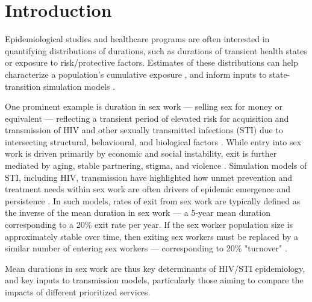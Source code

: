 \section{Introduction}\label{intro}
Epidemiological studies and healthcare programs
are often interested in quantifying distributions of durations,
such as durations of transient health states or exposure to risk/protective factors.
Estimates of these distributions can help
characterize a population's cumulative exposure \cite{Ben-Shlomo2023}, and
inform inputs to state-transition simulation models \cite{Garnett2011}.
\par
One prominent example is duration in sex work
--- selling sex for money or equivalent ---
reflecting a transient period of elevated risk for acquisition and transmission of
HIV and other sexually transmitted infections (STI) due to
intersecting structural, behavioural, and biological factors
\cite{Scorgie2012,Shannon2015,Baral2015msw}.
While entry into sex work is driven primarily by economic and social instability,
exit is further mediated by aging, stable partnering, stigma, and violence
\cite{Ingabire2012,Bowen2011,Lora2025}.
Simulation models of STI, including HIV, transmission have highlighted how
unmet prevention and treatment needs within sex work
are often drivers of epidemic emergence and persistence
\cite{Boily2002,Watts2010,Silhol2026}.
In such models, rates of exit from sex work are typically defined as
the inverse of the mean duration in sex work
--- \eg a 5-year mean duration corresponding to a 20\% exit rate per year.
If the sex worker population size is approximately stable over time, then
exiting sex workers must be replaced by a similar number of entering sex workers
--- \eg corresponding to 20\% "turnover" \cite{Knight2020}.
\par
Mean durations in sex work are thus
key determinants of HIV/STI epidemiology, and key inputs to transmission models,
particularly those aiming to compare the impacts of different prioritized services.
